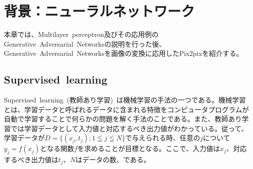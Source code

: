 \chapter{背景：ニューラルネットワーク}

本章では、Multilayer~perceptron及びその応用例のGenerative~Adversarial~Networksの説明を行った後、Generative~Adversarial~Networksを画像の変換に応用したPix2pixを紹介する。

\section{Supervised~learning}

Supervised~learning~(教師あり学習)~は機械学習の手法の一つである。機械学習とは、学習データと呼ばれるデータに含まれる特徴をコンピュータプログラムが自動で学習することで何らかの問題を解く手法のことである。また、教師あり学習では学習データとして入力値と対応するべき出力値がわかっている。従って、学習データが$D=\{(x_j,t_j); 1 \leqq j \leqq N\}$で与えられる時、任意の$j$について$y_j=f(x_j)$となる関数$f$を求めることが目標となる。ここで、入力値は$x_j$、対応するべき出力値は$t_j$、$N$はデータの数、である。

